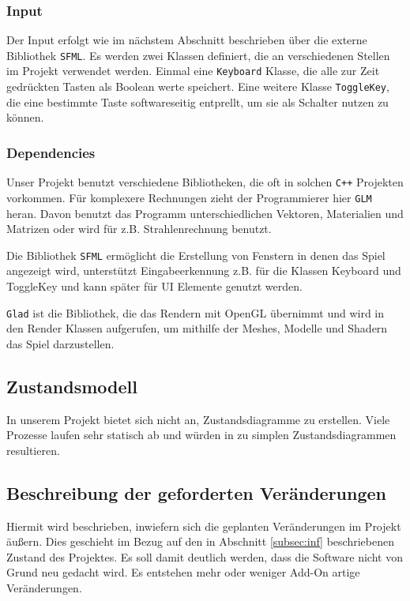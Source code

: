 \documentclass{article}
\begin{document}
\FloatBarrier
\subsubsection*{Input}

Der Input erfolgt wie im nächstem Abschnitt beschrieben über die externe Bibliothek \texttt{SFML}. Es werden zwei Klassen definiert, die an verschiedenen Stellen im Projekt verwendet werden. Einmal eine \texttt{Keyboard} Klasse, die alle zur Zeit gedrückten Tasten als Boolean werte speichert. Eine weitere Klasse \texttt{ToggleKey}, die eine bestimmte Taste softwareseitig entprellt, um sie als Schalter nutzen zu können.

\subsubsection*{Dependencies}

Unser Projekt benutzt verschiedene Bibliotheken, die oft in solchen \texttt{C++} Projekten vorkommen. Für komplexere Rechnungen zieht der Programmierer hier \texttt{GLM} heran. Davon benutzt das Programm unterschiedlichen Vektoren, Materialien und Matrizen oder wird für z.B. Strahlenrechnung benutzt.

Die Bibliothek \texttt{SFML} ermöglicht die Erstellung von Fenstern in denen das Spiel angezeigt wird, unterstützt Eingabeerkennung z.B. für die Klassen Keyboard und ToggleKey und kann später für UI Elemente genutzt werden.

\texttt{Glad} ist die Bibliothek, die das Rendern mit OpenGL übernimmt und wird in den Render Klassen aufgerufen, um mithilfe der Meshes, Modelle und Shadern das Spiel darzustellen.

\subsection{Zustandsmodell} \label{subsec:statemodel}

In unserem Projekt bietet sich nicht an, Zustandsdiagramme zu erstellen. Viele Prozesse laufen sehr statisch ab und würden in zu simplen Zustandsdiagrammen resultieren.

\subsection{Beschreibung der geforderten Veränderungen} \label{subsec:desc_of_changes}

Hiermit wird beschrieben, inwiefern sich die geplanten Veränderungen im Projekt äu\ss{}ern. Dies geschieht im Bezug auf den in Abschnitt \ref{subsec:inf} beschriebenen Zustand des Projektes. Es soll damit deutlich werden, dass die Software nicht von Grund neu gedacht wird. Es entstehen mehr oder weniger Add-On artige Veränderungen.
\end{document}
